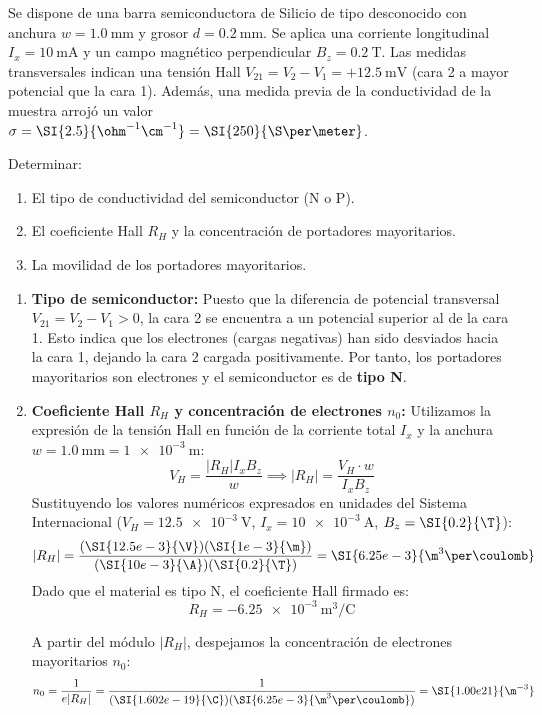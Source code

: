 \begin{ejemplo}
Se dispone de una barra semiconductora de Silicio de tipo desconocido con anchura $w = \SI{1.0}{\mm}$ y grosor $d = \SI{0.2}{\mm}$. Se aplica una corriente longitudinal $I_x = \SI{10}{\mA}$ y un campo magnético perpendicular $B_z = \SI{0.2}{\tesla}$. Las medidas transversales indican una tensión Hall $V_{21} = V_2 - V_1 = +\SI{12.5}{\mV}$ (cara 2 a mayor potencial que la cara 1). Además, una medida previa de la conductividad de la muestra arrojó un valor $\sigma = \SI{2.5}{\ohm^{-1}\cm^{-1}} = \SI{250}{\S\per\meter}$.

Determinar:
\begin{enumerate}[label=\alph*)]
    \item El tipo de conductividad del semiconductor (N o P).
    \item El coeficiente Hall $R_H$ y la concentración de portadores mayoritarios.
    \item La movilidad de los portadores mayoritarios.
\end{enumerate}
\tcblower

\begin{enumerate}[label=\alph*)]
    \item \textbf{Tipo de semiconductor:}
    Puesto que la diferencia de potencial transversal $V_{21} = V_2 - V_1 > 0$, la cara 2 se encuentra a un potencial superior al de la cara 1. Esto indica que los electrones (cargas negativas) han sido desviados hacia la cara 1, dejando la cara 2 cargada positivamente. Por tanto, los portadores mayoritarios son electrones y el semiconductor es de \textbf{tipo N}.

    \item \textbf{Coeficiente Hall $R_H$ y concentración de electrones $n_0$:}
    Utilizamos la expresión de la tensión Hall en función de la corriente total $I_x$ y la anchura $w = \SI{1.0}{\mm} = \SI{1e-3}{\m}$:
    \[
    V_H = \frac{|R_H| I_x B_z}{w} \implies |R_H| = \frac{V_H \cdot w}{I_x B_z}
    \]
    Sustituyendo los valores numéricos expresados en unidades del Sistema Internacional ($V_H = \SI{12.5e-3}{\V}$, $I_x = \SI{10e-3}{\A}$, $B_z = \SI{0.2}{\T}$):
    \[
    |R_H| = \frac{(\SI{12.5e-3}{\V})(\SI{1e-3}{\m})}{(\SI{10e-3}{\A})(\SI{0.2}{\T})} = \SI{6.25e-3}{\m^3\per\coulomb}
    \]
    Dado que el material es tipo N, el coeficiente Hall firmado es:
    \[
    R_H = -\SI{6.25e-3}{\m^3\per\coulomb}
    \]

    A partir del módulo $|R_H|$, despejamos la concentración de electrones mayoritarios $n_0$:
    \[
    n_0 = \frac{1}{e |R_H|} = \frac{1}{(\SI{1.602e-19}{\C})(\SI{6.25e-3}{\m^3\per\coulomb})} = \SI{1.00e21}{\m^{-3}}
    \]


\end{enumerate}
\end{ejemplo}

